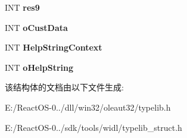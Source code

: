 \begin{DoxyCompactItemize}
\mbox{\label{struct_m_s_f_t___var_record_a4bf4c9898b918484c71f8e5566bf2643}} 
I\+NT {\bfseries res9}
\item 
\mbox{\label{struct_m_s_f_t___var_record_a18d0a7c34b390d0c07494fbe1e365951}} 
I\+NT {\bfseries o\+Cust\+Data}
\item 
\mbox{\label{struct_m_s_f_t___var_record_a6c93cb4bba008a4bae48a92d565eabe9}} 
I\+NT {\bfseries Help\+String\+Context}
\item 
\mbox{\label{struct_m_s_f_t___var_record_a8207f78fd6b98bbe5b24cfcd19a14af7}} 
I\+NT {\bfseries o\+Help\+String}
\end{DoxyCompactItemize}


该结构体的文档由以下文件生成\+:\begin{DoxyCompactItemize}
\item 
E\+:/\+React\+O\+S-\/0../dll/win32/oleaut32/typelib.\+h\item 
E\+:/\+React\+O\+S-\/0../sdk/tools/widl/typelib\+\_\+struct.\+h\end{DoxyCompactItemize}
